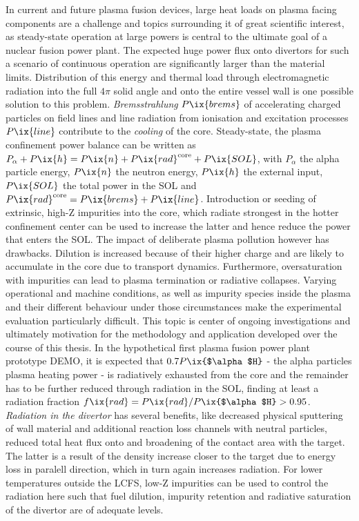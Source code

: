         In current and future plasma fusion devices, large heat loads on plasma facing components are a challenge and topics surrounding it of great scientific interest, as steady-state operation at large powers is central to the ultimate goal of a nuclear fusion power plant. The expected huge power flux onto divertors for such a scenario of continuous operation are significantly larger than the material limits. Distribution of this energy and thermal load through electromagnetic radiation into the full $4\pi$ solid angle and onto the entire vessel wall is one possible solution to this problem. \textit{Bremsstrahlung} $P\ix{brems}$ of accelerating charged particles on field lines and line radiation from ionisation and excitation processes $P\ix{line}$ contribute to the \textit{cooling} of the core. Steady-state, the plasma confinement power balance can be written as $P_{\alpha}+P\ix{h}=P\ix{n}+P\ix{rad}^{\text{core}}+P\ix{SOL}$, with $P_{\alpha}$ the alpha particle energy, $P\ix{n}$ the neutron energy, $P\ix{h}$ the external input, $P\ix{SOL}$ the total power in the SOL and $P\ix{rad}^{\text{core}}=P\ix{brems}+P\ix{line}$. Introduction or seeding of extrinsic, high-Z impurities into the core, which radiate strongest in the hotter confinement center can be used to increase the latter and hence reduce the power that enters the SOL\cite{Shubov2021,Schneider2006,Drawin1978}. The impact of deliberate plasma pollution however has drawbacks. Dilution is increased because of their higher charge and are likely to accumulate in the core due to transport dynamics. Furthermore, oversaturation with impurities can lead to plasma termination or radiative collapses. Varying operational and machine conditions, as well as impurity species inside the plasma and their different behaviour under those circumstances make the experimental evaluation particularly difficult\cite{Reimold2015}. This topic is center of ongoing investigations and ultimately motivation for the methodology and application developed over the course of this thesis. In the hypothetical first plasma fusion power plant prototype DEMO, it is expected that $0.7P\ix{$\alpha$H}$ - the alpha particles plasma heating power - is radiatively exhausted from the core and the remainder has to be further reduced through radiation in the SOL, finding at least a radiation fraction $f\ix{rad}=P\ix{rad}/P\ix{$\alpha$H}>0.95$. \textit{Radiation in the divertor} has several benefits, like decreased physical sputtering of wall material and additional reaction loss channels with neutral particles, reduced total heat flux onto and broadening of the contact area with the target. The latter is a result of the density increase closer to the target due to energy loss in paralell direction, which in turn again increases radiation. For lower temperatures outside the LCFS, low-Z impurities can be used to control the radiation here such that fuel dilution, impurity retention and radiative saturation of the divertor are of adequate levels\cite{Eich2013,Eich2011,Fuchert2020}.%
%
